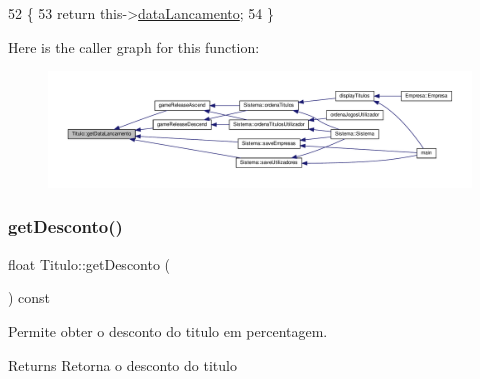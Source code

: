 \begin{DoxyCode}
52                                       \{
53         \textcolor{keywordflow}{return} this->\hyperlink{classTitulo_ae540ddf2c607eb0e4de29eb8c0cca7f0}{dataLancamento};
54 \}
\end{DoxyCode}
Here is the caller graph for this function\+:
\nopagebreak
\begin{figure}[H]
\begin{center}
\leavevmode
\includegraphics[width=350pt]{classTitulo_a1cb9b8c0a9dca73d5925922ccc041fa8_icgraph}
\end{center}
\end{figure}
\mbox{\label{classTitulo_ae7df7d468f8220fa32b2772df4c53081}} 
\subsubsection{\texorpdfstring{get\+Desconto()}{getDesconto()}}
{\footnotesize\ttfamily float Titulo\+::get\+Desconto (\begin{DoxyParamCaption}{ }\end{DoxyParamCaption}) const}



Permite obter o desconto do titulo em percentagem. 

\begin{DoxyReturn}{Returns}
Retorna o desconto do titulo 
\end{DoxyReturn}

